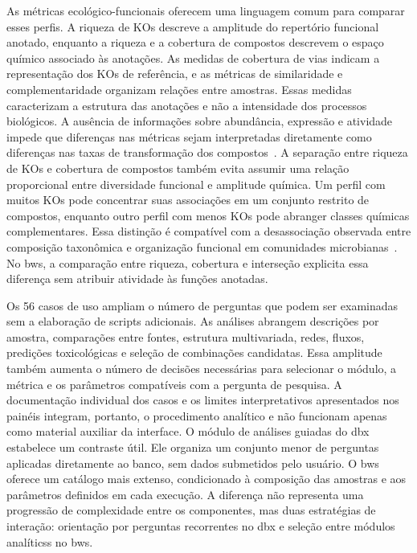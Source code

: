 As métricas ecológico-funcionais oferecem uma linguagem comum para comparar
esses perfis. A riqueza de KOs descreve a amplitude do repertório funcional
anotado, enquanto a riqueza e a cobertura de compostos descrevem o espaço
químico associado às anotações. As medidas de cobertura de vias indicam a
representação dos KOs de referência, e as métricas de similaridade e
complementaridade organizam relações entre amostras. Essas medidas caracterizam
a estrutura das anotações e não a intensidade dos processos biológicos. A
ausência de informações sobre abundância, expressão e atividade impede que
diferenças nas métricas sejam interpretadas diretamente como diferenças nas
taxas de transformação dos compostos~\cite{prosser2015omics}. A separação entre riqueza de KOs e cobertura de compostos também evita assumir
uma relação proporcional entre diversidade funcional e amplitude química. Um
perfil com muitos KOs pode concentrar suas associações em um conjunto
restrito de compostos, enquanto outro perfil com menos KOs pode abranger
classes químicas complementares. Essa distinção é compatível com a
desassociação observada entre composição taxonômica e organização funcional em
comunidades microbianas~\cite{louca2018functionalredundancy}. No
\gls{bws}, a comparação entre riqueza, cobertura e interseção explicita essa
diferença sem atribuir atividade às funções anotadas.

Os 56 casos de uso ampliam o número de perguntas que podem ser examinadas sem
a elaboração de scripts adicionais. As análises abrangem descrições por
amostra, comparações entre fontes, estrutura multivariada, redes, fluxos,
predições toxicológicas e seleção de combinações candidatas. Essa amplitude
também aumenta o número de decisões necessárias para selecionar o módulo, a
métrica e os parâmetros compatíveis com a pergunta de pesquisa. A
documentação individual dos casos e os limites interpretativos apresentados
nos painéis integram, portanto, o procedimento analítico e não funcionam apenas
como material auxiliar da interface. O módulo de análises guiadas do \gls{dbx} estabelece um contraste útil. Ele
organiza um conjunto menor de perguntas aplicadas diretamente ao banco, sem
dados submetidos pelo usuário. O \gls{bws} oferece um catálogo mais extenso,
condicionado à composição das amostras e aos parâmetros definidos em cada
execução. A diferença não representa uma progressão de complexidade entre os
componentes, mas duas estratégias de interação: orientação por perguntas
recorrentes no \gls{dbx} e seleção entre módulos analíticss no \gls{bws}. 

